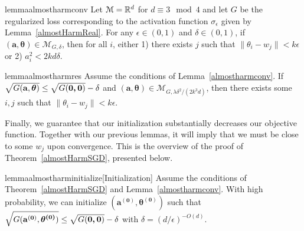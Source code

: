 %
\begin{restatable}{lemma}{almostharmconv}\label{almostharmconv}
Let $\mathcal{M} = {\mathbb{R}}^d$ for $d \equiv 3 \mod 4$ and let $G$ be the regularized loss corresponding to the activation function $\sigma_\epsilon$ given by Lemma~\ref{almostHarmReal}. For any $\epsilon \in (0,1)$ and $\delta \in (0, 1)$, if $\boldsymbol{(a,\theta)} \in \mathcal{M}_{G,\delta}$, then for all $i$, either 1) there exists $j$ such that $\|\theta_i - w_j\| < k\epsilon$ or 2) $a_i^2 < 2kd\delta$.
\end{restatable}
%
\begin{restatable}{lemma}{almostharmres}\label{almostHarmRes}
  Assume the conditions of Lemma~\ref{almostharmconv}. If
$\sqrt{G({\bf a, \boldsymbol{\theta}})} \leq \sqrt{G(\boldsymbol{0,0})} - \delta$
  and $(\boldsymbol{a,\theta}) \in \mathcal{M}_{G,\lambda \delta^2/(2k^3d)}$,
  then there exists some $i, j$ such that $\|\theta_i - w_j\| <k\epsilon$.
\end{restatable}
 Finally, we guarantee that our initialization substantially decreases our objective function. Together with our previous lemmas, it will imply that we must be close to some $w_j$ upon convergence. This is the overview of the proof of Theorem~\ref{almostHarmSGD}, presented below.
 \begin{restatable}{lemma}{almostharminitialize}[Initialization]\label{almostHarmInitialize}
Assume the conditions of Theorem~\ref{almostHarmSGD} and Lemma~\ref{almostharmconv}. With high probability, we can initialize $\boldsymbol{(a^{(0)},\theta^{(0)})}$ such that $\sqrt{G({\bf a^{(0)}}, \boldsymbol{\theta^{(0)}})} \leq \sqrt{G(\boldsymbol{0,0})} -\delta$ with $\delta = (d/\epsilon)^{ - O(d)}$.
 \end{restatable}
